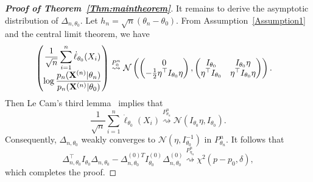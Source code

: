 \documentclass[11pt]{article}
\theoremstyle{plain}
\theoremstyle{definition}
\theoremstyle{remark}
\begin{document}
\begin{appendices}
\begin{proof}[\textbf{Proof of Theorem~\ref{Thm:maintheorem}}]
It remains to derive the asymptotic distribution of $\Delta_{n,\theta_0}$.
Let $h_n=\sqrt{n}(\theta_n-\theta_0)$.
     From Assumption~\ref{Assumption1} and the central limit theorem, we have
\begin{equation*}
    \begin{split}
    \left(
    \begin{matrix}
        \displaystyle
        \frac{1}{\sqrt{n}}\sum^n_{i=1}\dot{\ell}_{\theta_0}(X_i)
        \\
        \displaystyle
        \log \frac{p_n(\mathbf{X}^{(n)}|\theta_n)}{p_n(\mathbf{X}^{(n)}|\theta_0)}
    \end{matrix}
    \right)
    &\overset{P_0^n}{\rightsquigarrow}
    \mathcal{N}\left(
    \left(
    \begin{matrix}
        0\\
        -\frac{1}{2}\eta^\top  I_{\theta_0}\eta
    \end{matrix}
    \right),
    \left(
        \begin{matrix}
            I_{\theta_0}&I_{\theta_0}\eta\\
            \eta^\top  I_{\theta_0}&\eta^\top  I_{\theta_0}\eta
        \end{matrix}
    \right)
    \right).
    \end{split}
\end{equation*}
Then Le Cam's third lemma~\citep[Example 6.7]{van2000asymptotic} implies that
\begin{equation*}
    \frac{1}{\sqrt{n}}\sum^n_{i=1}\dot{\ell}_{\theta_0}(X_i)\overset{P^n_{\theta_n}}{\rightsquigarrow} \mathcal{N}(I_{\theta_0}\eta,I_{\theta_0}).
\end{equation*}
Consequently,
$
\Delta_{n,\theta_0}
$
weakly converges to $\mathcal{N}(\eta, I_{\theta_0}^{-1})$ in  $P^n_{\theta_n}$.
It follows that
\begin{equation*}
\Delta_{n,\theta_0}^\top  I_{\theta_0} \Delta_{n,\theta_0}
-
\Delta_{n,\theta_0}^{{(0)}T} I^{(0)}_{\theta_0} \Delta^{(0)}_{n,\theta_0}
\overset{P_{\eta_n}^n}{\rightsquigarrow} \chi^2(p-p_0,\delta),
\end{equation*}
which completes the proof.


\end{proof}
\end{appendices}
\end{document}
